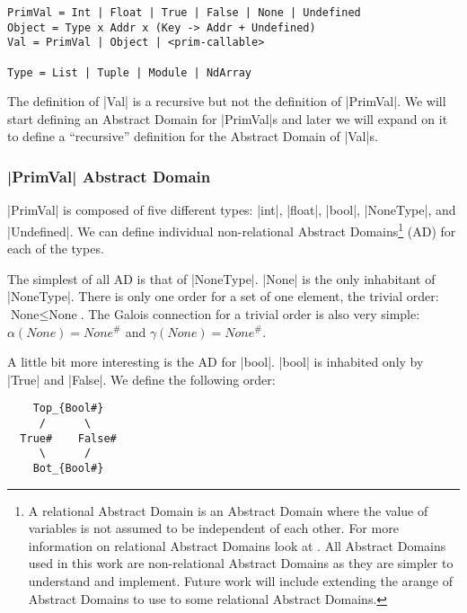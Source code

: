 \begin{verbatim}
PrimVal = Int | Float | True | False | None | Undefined
Object = Type x Addr x (Key -> Addr + Undefined)
Val = PrimVal | Object | <prim-callable>

Type = List | Tuple | Module | NdArray
\end{verbatim}

The definition of \pycode|Val| is a recursive but not the definition of
\pycode|PrimVal|. We will start defining an Abstract Domain for
\pycode|PrimVal|s and later we will expand on it to define a
\enquote{recursive} definition for the Abstract Domain of \pycode|Val|s.

\subsubsection{\texorpdfstring{\pycode|PrimVal| Abstract
Domain}{PrimVal Abstract Domain}}\label{primval-abstract-domain}

\pycode|PrimVal| is composed of five different types: \pycode|int|,
\pycode|float|, \pycode|bool|, \pycode|NoneType|, and
\pycode|Undefined|. We can define individual non-relational Abstract
Domains\footnote{A relational Abstract Domain is an Abstract Domain
  where the value of variables is not assumed to be independent of each
  other. For more information on relational Abstract Domains look at
  {}. All Abstract Domains used
  in this work are non-relational Abstract Domains as they are simpler
  to understand and implement. Future work will include extending the
  arange of Abstract Domains to use to some relational Abstract Domains.}
(AD) for each of the types.

The simplest of all AD is that of \pycode|NoneType|. \pycode|None| is
the only inhabitant of \pycode|NoneType|. There is only one order for a
set of one element, the trivial order: \(\text{None} \le \text{None}\).
The Galois connection for a trivial order is also very simple:
\(\alpha(None) = None^{\#}\) and \(\gamma(None) = None^{\#}\).

A little bit more interesting is the AD for \pycode|bool|. \pycode|bool|
is inhabited only by \pycode|True| and \pycode|False|. We define the
following order:

{}

\begin{verbatim}
    Top_{Bool#}
     /      \
  True#    False#
     \      /
    Bot_{Bool#}
\end{verbatim}


